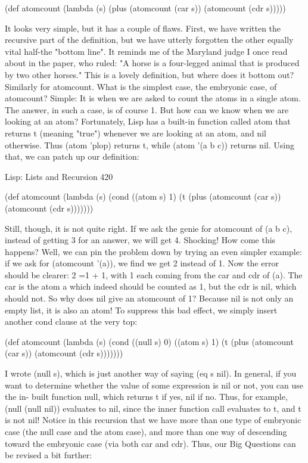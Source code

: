 (def atomcount (lambda (s)
       (plus (atomcount (car s)) (atomcount (cdr s)))))

        It looks very simple, but it has a couple of flaws. First, we have written the
recursive part of the definition, but we have utterly forgotten the other equally vital
half-the "bottom line". It reminds me of the Maryland judge I once read about in the
paper, who ruled: "A horse is a four-legged animal that is produced by two other
horses." This is a lovely definition, but where does it bottom out? Similarly for
atomcount. What is the simplest case, the embryonic case, of atomcount? Simple: It
is when we are asked to count the atoms in a single atom. The answer, in such a case,
is of course 1. But how can we know when we are looking at an atom? Fortunately,
Lisp has a built-in function called atom that returns t (meaning "true") whenever we
are looking at an atom, and nil otherwise. Thus (atom 'plop) returns t, while (atom
'(a b c)) returns nil. Using that, we can patch up our definition:




Lisp: Lists and Recursion                                                           420

(def atomcount (lambda (s)
       (cond ((atom s) 1)
              (t (plus (atomcount (car s)) (atomcount (cdr s)))))))

       Still, though, it is not quite right. If we ask the genie for atomcount of (a b c),
instead of getting 3 for an answer, we will get 4. Shocking! How come this happens?
Well, we can pin the problem down by trying an even simpler example: if we ask for
(atomcount '(a)), we find we get 2 instead of 1. Now the error should be clearer: 2 =1
+ 1, with 1 each coming from the car and cdr of (a). The car is the atom a which
indeed should be counted as 1, but the cdr is nil, which should not. So why does nil
give an atomcount of 1? Because nil is not only an empty list, it is also an atom! To
suppress this bad effect, we simply insert another cond clause at the very top:

(def atomcount (lambda (s)
       (cond ((null s) 0)
              ((atom s) 1)
              (t (plus (atomcount (car s)) (atomcount (cdr s)))))))

I wrote (null s), which is just another way of saying (eq s nil). In general, if you want
to determine whether the value of some expression is nil or not, you can use the in-
built function null, which returns t if yes, nil if no. Thus, for example, (null (null
nil)) evaluates to nil, since the inner function call evaluates to t, and t is not nil!
        Notice in this recursion that we have more than one type of embryonic case
(the null case and the atom case), and more than one way of descending toward the
embryonic case (via both car and cdr). Thus, our Big Questions can be revised a bit
further:

